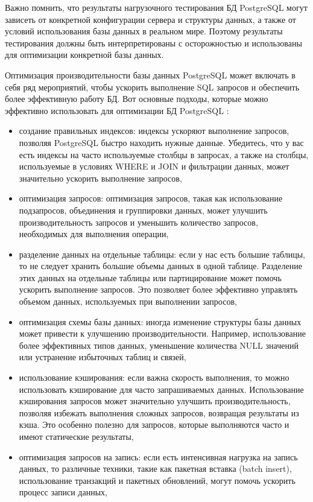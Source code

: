 Важно помнить, что результаты нагрузочного тестирования БД PostgreSQL могут зависеть от конкретной конфигурации сервера и структуры данных, а также от условий использования базы данных в реальном мире. Поэтому результаты тестирования должны быть интерпретированы с осторожностью и использованы для оптимизации конкретной базы данных.

Оптимизация производительности базы данных PostgreSQL может включать в себя ряд мероприятий, чтобы ускорить выполнение SQL запросов и обеспечить более эффективную работу БД. Вот основные подходы, которые можно эффективно использовать для оптимизации БД PostgreSQL \cite{online8, online9}:

\begin{itemize}
    \item создание правильных индексов: индексы ускоряют выполнение запросов, позволяя PostgreSQL быстро находить нужные данные. Убедитесь, что у вас есть индексы на часто используемые столбцы в запросах, а также на столбцы, используемые в условиях WHERE и JOIN и фильтрации данных, может значительно ускорить выполнение запросов,
    \item оптимизация запросов: оптимизация запросов, такая как использование подзапросов, объединения и группировки данных, может улучшить производительность запросов и уменьшить количество запросов, необходимых для выполнения операции,
    \item разделение данных на отдельные таблицы: если у нас есть большие таблицы, то не следует хранить большие объемы данных в одной таблице. Разделение этих данных на отдельные таблицы или партицирование может помочь ускорить выполнение запросов. Это позволяет более эффективно управлять объемом данных, используемых при выполнении запросов,
    \item оптимизация схемы базы данных: иногда изменение структуры базы данных может привести к улучшению производительности. Например, использование более эффективных типов данных, уменьшение количества NULL значений или устранение избыточных таблиц и связей,
    \item использование кэширования: если важна скорость выполнения, то можно использовать кэширование для часто запрашиваемых данных. Использование кэширования запросов может значительно улучшить производительность, позволяя избежать выполнения сложных запросов, возвращая результаты из кэша. Это особенно полезно для запросов, которые выполняются часто и имеют статические результаты,
    \item оптимизация запросов на запись: если есть интенсивная нагрузка на запись данных, то различные техники, такие как пакетная вставка (batch insert), использование транзакций и пакетных обновлений, могут помочь ускорить процесс записи данных,

\end{itemize}
